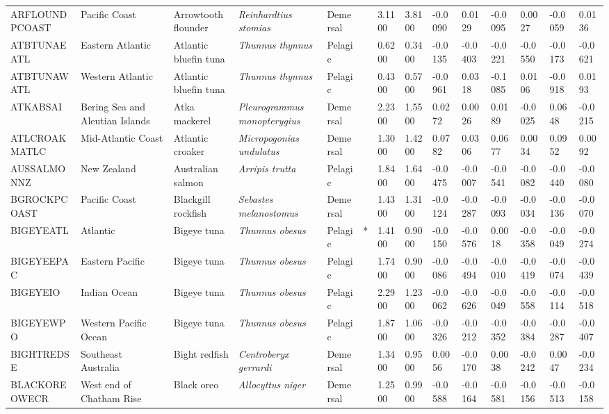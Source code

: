 \begin{longtable}{p{2.8cm}p{2cm}p{1.7cm}p{1.7cm}p{1cm}p{0.3cm}p{1cm}p{1cm}p{1cm}p{1cm}p{1cm}p{1cm}p{1cm}p{1cm}}
  ARFLOUNDPCOAST & Pacific Coast & Arrowtooth flounder & \textit{Reinhardtius stomias} & Demersal &   & 3.1100 & 3.8100 & -0.0090 & 0.0129 & -0.0095 & 0.0027 & -0.0059 & 0.0136 \\ 
  ATBTUNAEATL & Eastern Atlantic & Atlantic bluefin tuna & \textit{Thunnus thynnus} & Pelagic &   & 0.6200 & 0.3400 & -0.0135 & -0.0403 & -0.0221 & -0.0550 & -0.0173 & -0.0621 \\ 
  ATBTUNAWATL & Western Atlantic & Atlantic bluefin tuna & \textit{Thunnus thynnus} & Pelagic &   & 0.4300 & 0.5700 & -0.0961 & 0.0318 & -0.1085 & 0.0106 & -0.0918 & 0.0193 \\ 
  ATKABSAI & Bering Sea and Aleutian Islands & Atka mackerel & \textit{Pleurogrammus monopterygius} & Demersal &   & 2.2300 & 1.5500 & 0.0272 & 0.0026 & 0.0189 & -0.0025 & 0.0648 & -0.0215 \\ 
  ATLCROAKMATLC & Mid-Atlantic Coast & Atlantic croaker & \textit{Micropogonias undulatus} & Demersal &   & 1.3000 & 1.4200 & 0.0782 & 0.0306 & 0.0677 & 0.0034 & 0.0952 & 0.0092 \\ 
  AUSSALMONNZ & New Zealand & Australian salmon & \textit{Arripis trutta} & Pelagic &   & 1.8400 & 1.6400 & -0.0475 & -0.0007 & -0.0541 & -0.0082 & -0.0440 & -0.0080 \\ 
  BGROCKPCOAST & Pacific Coast & Blackgill rockfish & \textit{Sebastes melanostomus} & Demersal &   & 1.4300 & 1.3100 & -0.0124 & -0.0287 & -0.0093 & -0.0034 & -0.0136 & -0.0070 \\ 
  BIGEYEATL & Atlantic & Bigeye tuna & \textit{Thunnus obesus} & Pelagic & * & 1.4100 & 0.9000 & -0.0150 & -0.0576 & 0.0018 & -0.0358 & -0.0049 & -0.0274 \\ 
  BIGEYEEPAC & Eastern Pacific & Bigeye tuna & \textit{Thunnus obesus} & Pelagic &   & 1.7400 & 0.9000 & -0.0086 & -0.0494 & -0.0010 & -0.0419 & -0.0074 & -0.0439 \\ 
  BIGEYEIO & Indian Ocean & Bigeye tuna & \textit{Thunnus obesus} & Pelagic &   & 2.2900 & 1.2300 & -0.0062 & -0.0626 & -0.0049 & -0.0558 & -0.0114 & -0.0518 \\ 
  BIGEYEWPO & Western Pacific Ocean & Bigeye tuna & \textit{Thunnus obesus} & Pelagic &   & 1.8700 & 1.0600 & -0.0326 & -0.0212 & -0.0352 & -0.0384 & -0.0287 & -0.0407 \\ 
  BIGHTREDSE & Southeast Australia & Bight redfish & \textit{Centroberyx gerrardi} & Demersal &   & 1.3400 & 0.9500 & 0.0056 & -0.0170 & 0.0038 & -0.0242 & 0.0047 & -0.0234 \\ 
  BLACKOREOWECR & West end of Chatham Rise & Black oreo & \textit{Allocyttus niger} & Demersal &   & 1.2500 & 0.9900 & -0.0588 & -0.0164 & -0.0581 & -0.0156 & -0.0513 & -0.0158 \\ 

\end{longtable}
